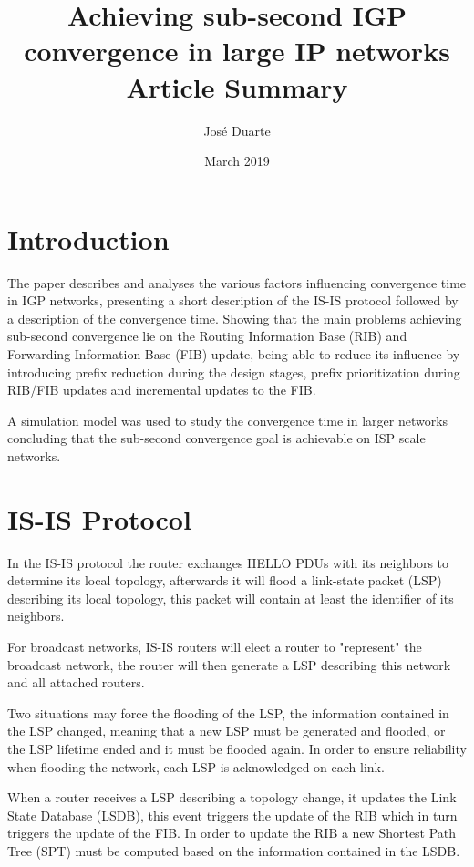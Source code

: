 \documentclass[a4paper, 11pt, UTF8]{article}
\title{%
Achieving sub-second IGP convergence in large IP networks \\
	\large Article Summary}
\author{José Duarte}
\date{March 2019}
\begin{document}
\maketitle

\section{Introduction}
The paper describes and analyses the various factors influencing convergence time in IGP networks,
presenting a short description of the IS-IS protocol followed by a description of the convergence time.
Showing that the main problems achieving sub-second convergence lie on the Routing Information Base (RIB) and
Forwarding Information Base (FIB) update, 
being able to reduce its influence by introducing prefix reduction during the design stages, 
prefix prioritization during RIB/FIB updates and incremental updates to the FIB.

A simulation model was used to study the convergence time in larger networks concluding that the sub-second convergence goal is achievable on ISP scale networks.

\section{IS-IS Protocol}
In the IS-IS protocol the router exchanges HELLO PDUs with its neighbors to determine its local topology, 
afterwards it will flood a link-state packet (LSP) describing its local topology, 
this packet will contain at least the identifier of its neighbors.

For broadcast networks, IS-IS routers will elect a router to "represent" the broadcast network, 
the router will then generate a LSP describing this network and all attached routers.

Two situations may force the flooding of the LSP, 
the information contained in the LSP changed, meaning that a new LSP must be generated and flooded, 
or the LSP lifetime ended and it must be flooded again.
In order to ensure reliability when flooding the network, each LSP is acknowledged on each link.

When a router receives a LSP describing a topology change, it updates the Link State Database (LSDB), 
this event triggers the update of the RIB
which in turn triggers the update of the FIB.
In order to update the RIB a new Shortest Path Tree (SPT) 
must be computed based on the information contained in the LSDB.
\end{document}
